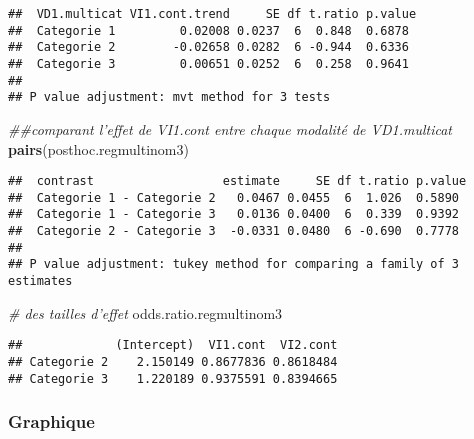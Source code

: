 \documentclass[
]{book}
\newenvironment{Shaded}{\begin{snugshade}}{\end{snugshade}}
\newcommand{\CommentTok}[1]{\textcolor[rgb]{0.56,0.35,0.01}{\textit{#1}}}
\newcommand{\KeywordTok}[1]{\textcolor[rgb]{0.13,0.29,0.53}{\textbf{#1}}}
\newcommand{\NormalTok}[1]{#1}
\begin{document}
\begin{verbatim}
##  VD1.multicat VI1.cont.trend     SE df t.ratio p.value
##  Categorie 1         0.02008 0.0237  6  0.848  0.6878 
##  Categorie 2        -0.02658 0.0282  6 -0.944  0.6336 
##  Categorie 3         0.00651 0.0252  6  0.258  0.9641 
## 
## P value adjustment: mvt method for 3 tests
\end{verbatim}

\begin{Shaded}
\begin{Highlighting}[]
\CommentTok{##comparant l'effet de VI1.cont entre chaque modalité de VD1.multicat}
\KeywordTok{pairs}\NormalTok{(posthoc.regmultinom3)}
\end{Highlighting}
\end{Shaded}

\begin{verbatim}
##  contrast                  estimate     SE df t.ratio p.value
##  Categorie 1 - Categorie 2   0.0467 0.0455  6  1.026  0.5890 
##  Categorie 1 - Categorie 3   0.0136 0.0400  6  0.339  0.9392 
##  Categorie 2 - Categorie 3  -0.0331 0.0480  6 -0.690  0.7778 
## 
## P value adjustment: tukey method for comparing a family of 3 estimates
\end{verbatim}

\begin{Shaded}
\begin{Highlighting}[]
\CommentTok{# des tailles d'effet}
\NormalTok{odds.ratio.regmultinom3}
\end{Highlighting}
\end{Shaded}

\begin{verbatim}
##             (Intercept)  VI1.cont  VI2.cont
## Categorie 2    2.150149 0.8677836 0.8618484
## Categorie 3    1.220189 0.9375591 0.8394665
\end{verbatim}

\hypertarget{graphique-15}{%
\subsubsection{Graphique}\label{graphique-15}}
\end{document}
